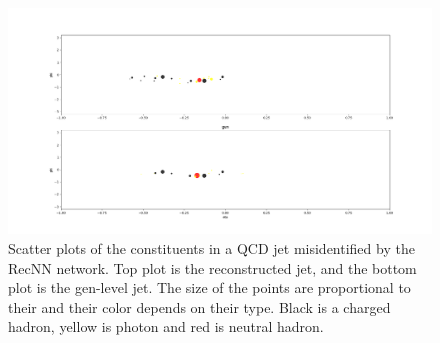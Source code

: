 \begin{figure}
    \centering
    \includegraphics[width=\textwidth]{Images/jet_display1.png}
    \caption{Scatter plots of the constituents in a QCD jet misidentified by the RecNN network. Top plot is the reconstructed jet, and the bottom plot is the gen-level jet. The size of the points are proportional to their \pt and their color depends on their type. Black is a charged hadron, yellow is photon and red is neutral hadron.}
    \label{fig:jet_display}
\end{figure}